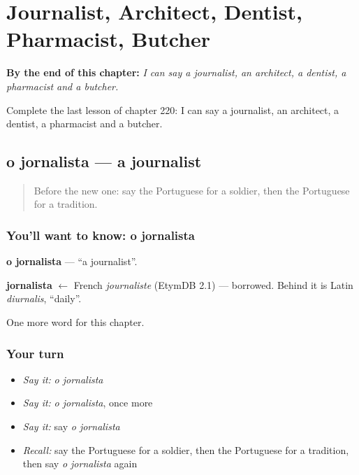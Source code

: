 
\chapter{Journalist, Architect, Dentist, Pharmacist, Butcher}
\label{ch:pt-journalist-architect-dentist-pharmacist-butcher}

\begin{chapteropening}
\textbf{By the end of this chapter:} \emph{I can say a journalist, an architect, a dentist, a pharmacist and a butcher.}

Complete the last lesson of chapter 220: I can say a journalist, an architect, a dentist, a pharmacist and a butcher.
\end{chapteropening}

\section[o jornalista]{o jornalista — a journalist}

\label{lesson:PT-C220-jornalista}



\begin{quote}
Before the new one: say the Portuguese for a soldier, then the Portuguese for a tradition.
\end{quote}

\subsection*{You'll want to know: o jornalista}
\textbf{o jornalista} — \textquotedblleft{}a journalist\textquotedblright{}.

\begin{cousinweb}
\textbf{jornalista} $\leftarrow$ French \emph{journaliste} (EtymDB 2.1) — borrowed. Behind it is Latin \emph{diurnalis}, \textquotedblleft{}daily\textquotedblright{}.
\end{cousinweb}

\begin{grammarlens}[title={What you've built}]
One more word for this chapter.
\end{grammarlens}

\subsection*{Your turn}
\begin{itemize}
\raggedright
  \item \emph{Say it:} \emph{o jornalista}
  \item \emph{Say it:} \emph{o jornalista}, once more
  \item \emph{Say it:} say \emph{o jornalista}
  \item \emph{Recall:} say the Portuguese for a soldier, then the Portuguese for a tradition, then say \emph{o jornalista} again
\end{itemize}

